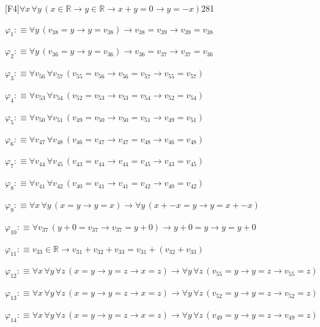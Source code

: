 \begin{fullproof}{[F4]}{$\forall x\,\forall y\,(x \in \mathbb{R} \to y \in \mathbb{R} \to x + y = 0 \to y = -x)$}{281}
\begin{ptree}
\noLine
{}
\end{ptree}
\begin{abbrevlist}
\item $\varphi_{1} :\equiv \forall y\,(v_{38} = y \to y = v_{38}) \to v_{38} = v_{39} \to v_{39} = v_{38}$
\item $\varphi_{2} :\equiv \forall y\,(v_{36} = y \to y = v_{36}) \to v_{36} = v_{37} \to v_{37} = v_{36}$
\item $\varphi_{3} :\equiv \forall v_{56}\,\forall v_{57}\,(v_{55} = v_{56} \to v_{56} = v_{57} \to v_{55} = v_{57})$
\item $\varphi_{4} :\equiv \forall v_{53}\,\forall v_{54}\,(v_{52} = v_{53} \to v_{53} = v_{54} \to v_{52} = v_{54})$
\item $\varphi_{5} :\equiv \forall v_{50}\,\forall v_{51}\,(v_{49} = v_{50} \to v_{50} = v_{51} \to v_{49} = v_{51})$
\item $\varphi_{6} :\equiv \forall v_{47}\,\forall v_{48}\,(v_{46} = v_{47} \to v_{47} = v_{48} \to v_{46} = v_{48})$
\item $\varphi_{7} :\equiv \forall v_{44}\,\forall v_{45}\,(v_{43} = v_{44} \to v_{44} = v_{45} \to v_{43} = v_{45})$
\item $\varphi_{8} :\equiv \forall v_{41}\,\forall v_{42}\,(v_{40} = v_{41} \to v_{41} = v_{42} \to v_{40} = v_{42})$
\item $\varphi_{9} :\equiv \forall x\,\forall y\,(x = y \to y = x) \to \forall y\,(x + -x = y \to y = x + -x)$
\item $\varphi_{10} :\equiv \forall v_{37}\,(y + 0 = v_{37} \to v_{37} = y + 0) \to y + 0 = y \to y = y + 0$
\item $\varphi_{11} :\equiv v_{33} \in \mathbb{R} \to v_{31} + v_{32} + v_{33} = v_{31} + (v_{32} + v_{33})$
\item $\varphi_{12} :\equiv \forall x\,\forall y\,\forall z\,(x = y \to y = z \to x = z) \to \forall y\,\forall z\,(v_{55} = y \to y = z \to v_{55} = z)$
\item $\varphi_{13} :\equiv \forall x\,\forall y\,\forall z\,(x = y \to y = z \to x = z) \to \forall y\,\forall z\,(v_{52} = y \to y = z \to v_{52} = z)$
\item $\varphi_{14} :\equiv \forall x\,\forall y\,\forall z\,(x = y \to y = z \to x = z) \to \forall y\,\forall z\,(v_{49} = y \to y = z \to v_{49} = z)$

\end{abbrevlist}
\end{fullproof}
